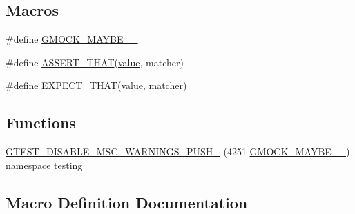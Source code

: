 \subsection*{Macros}
\begin{DoxyCompactItemize}
\item 
\#define \mbox{\hyperlink{_obj__test_2lib_2googletest-master_2googlemock_2include_2gmock_2gmock-matchers_8h_a2e98579585b1c3e77613384612912612}{G\+M\+O\+C\+K\+\_\+\+M\+A\+Y\+B\+E\+\_\+\_\+}}
\item 
\#define \mbox{\hyperlink{_obj__test_2lib_2googletest-master_2googlemock_2include_2gmock_2gmock-matchers_8h_a41d888579850c16583baea33ee8d057e}{A\+S\+S\+E\+R\+T\+\_\+\+T\+H\+AT}}(\mbox{\hyperlink{_obj__test_2lib_2googletest-master_2googlemock_2test_2gmock-matchers__test_8cc_a337b8a670efc0b086ad3af163f3121b6}{value}},  matcher)
\item 
\#define \mbox{\hyperlink{_obj__test_2lib_2googletest-master_2googlemock_2include_2gmock_2gmock-matchers_8h_ac31e206123aa702e1152bb2735b31409}{E\+X\+P\+E\+C\+T\+\_\+\+T\+H\+AT}}(\mbox{\hyperlink{_obj__test_2lib_2googletest-master_2googlemock_2test_2gmock-matchers__test_8cc_a337b8a670efc0b086ad3af163f3121b6}{value}},  matcher)
\end{DoxyCompactItemize}
\subsection*{Functions}
\begin{DoxyCompactItemize}
\item 
\mbox{\hyperlink{_obj__test_2lib_2googletest-master_2googlemock_2include_2gmock_2gmock-matchers_8h_a76d5edfe42aefbbbf81289a6a12f3761}{G\+T\+E\+S\+T\+\_\+\+D\+I\+S\+A\+B\+L\+E\+\_\+\+M\+S\+C\+\_\+\+W\+A\+R\+N\+I\+N\+G\+S\+\_\+\+P\+U\+S\+H\+\_\+}} (4251 \mbox{\hyperlink{_obj__test_2lib_2googletest-master_2googlemock_2include_2gmock_2gmock-matchers_8h_a2e98579585b1c3e77613384612912612}{G\+M\+O\+C\+K\+\_\+\+M\+A\+Y\+B\+E\+\_\+\_\+}}) namespace testing
\end{DoxyCompactItemize}


\subsection{Macro Definition Documentation}
\mbox{\label{_obj__test_2lib_2googletest-master_2googlemock_2include_2gmock_2gmock-matchers_8h_a41d888579850c16583baea33ee8d057e}} 

